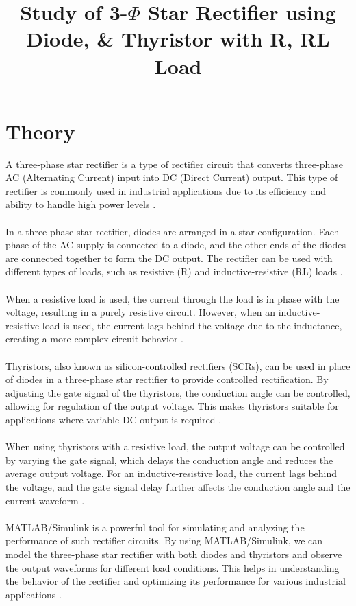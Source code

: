 \documentclass[12pt]{article}
\title{Study of 3-\(\Phi\) Star Rectifier using Diode, \& Thyristor with R, RL Load}
\author{}
\date{}
\begin{document}


\pagebreak

\tableofcontents

\pagebreak
{}
\maketitle

\section*{Theory}
A three-phase star rectifier is a type of rectifier circuit that converts three-phase AC (Alternating Current) input into DC (Direct Current) output. This type of rectifier is commonly used in industrial applications due to its efficiency and ability to handle high power levels \cite{power_electronics}.
\\\\
In a three-phase star rectifier, diodes are arranged in a star configuration. Each phase of the AC supply is connected to a diode, and the other ends of the diodes are connected together to form the DC output. The rectifier can be used with different types of loads, such as resistive (R) and inductive-resistive (RL) loads \cite{rectifier_design}.
\\\\
When a resistive load is used, the current through the load is in phase with the voltage, resulting in a purely resistive circuit. However, when an inductive-resistive load is used, the current lags behind the voltage due to the inductance, creating a more complex circuit behavior \cite{electrical_machines}.
\\\\
Thyristors, also known as silicon-controlled rectifiers (SCRs), can be used in place of diodes in a three-phase star rectifier to provide controlled rectification. By adjusting the gate signal of the thyristors, the conduction angle can be controlled, allowing for regulation of the output voltage. This makes thyristors suitable for applications where variable DC output is required \cite{thyristor_control}.
\\\\
When using thyristors with a resistive load, the output voltage can be controlled by varying the gate signal, which delays the conduction angle and reduces the average output voltage. For an inductive-resistive load, the current lags behind the voltage, and the gate signal delay further affects the conduction angle and the current waveform \cite{power_electronics}.
\\\\
MATLAB/Simulink is a powerful tool for simulating and analyzing the performance of such rectifier circuits. By using MATLAB/Simulink, we can model the three-phase star rectifier with both diodes and thyristors and observe the output waveforms for different load conditions. This helps in understanding the behavior of the rectifier and optimizing its performance for various industrial applications \cite{simulink_guide}.
\end{document}

